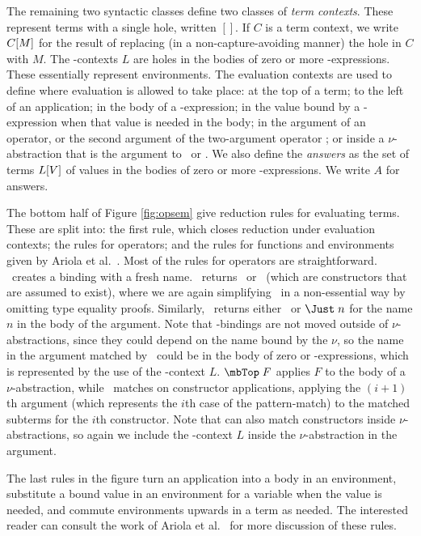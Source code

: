 \documentclass[natbib]{sigplanconf}
\begin{document}
The remaining two syntactic classes define two classes of \emph{term
  contexts}. These represent terms with a single hole, written $[]$. If
$C$ is a term context, we write $C[M]$ for the result of
replacing (in a non-capture-avoiding manner) the hole in $C$ with $M$.
The -contexts $L$ are holes in the bodies of zero or more
-expressions. These essentially represent environments.  The
evaluation contexts are used to define where evaluation is allowed to
take place: at the top of a term; to the left of an application; in
the body of a -expression; in the value bound by a
-expression when that value is needed in the body; in the
argument of an operator, or the second argument of the two-argument
operator \cmp; or inside a $\nu$-abstraction that is the argument to
\boundP\ or \case. We also define the \emph{answers} as the set of
terms $L[V]$ of values in the bodies of zero or more
-expressions. We write $A$ for answers.


The bottom half of Figure \ref{fig:opsem} give reduction rules for
evaluating terms. These are split into: the first rule, which closes
reduction under evaluation contexts; the rules for operators; and the
rules for functions and environments given by Ariola et
al.~\cite{ariola95}. Most of the rules for operators are
straightforward.  \nuOp\ creates a binding with a fresh name. \cmp\
returns \True\ or \False\ (which are constructors that are assumed to
exist), where we are again simplifying \ourlib\ in a non-essential way
by omitting type equality proofs. Similarly, \boundP\ returns either
\Nothing\ or $\Just\;n$ for the name $n$ in the body of the argument.
Note that \letname-bindings are not moved outside of
$\nu$-abstractions, since they could depend on the name bound by the $\nu$, so
the name in the argument matched by \boundP\ could be in the body of
zero or -expressions, which is represented by the use of the
\letname-context $L$. $\mbTop\;F$ applies $F$ to the body of a
$\nu$-abstraction, while \case\ matches on constructor applications,
applying the $(i+1)$th argument (which represents the $i$th case of
the pattern-match) to the matched subterms for the $i$th constructor.
Note that \case[] can also match constructors inside $\nu$-abstractions,
so again we include the \letname-context $L$ inside the
$\nu$-abstraction in the argument.

The last rules in the figure turn an application into a body
in an environment, substitute a bound value in an environment for a
variable when the value is needed, and commute environments upwards in
a term as needed. The interested reader can consult the work of Ariola
et al.~\cite{ariola95} for more discussion of these rules.
\end{document}
